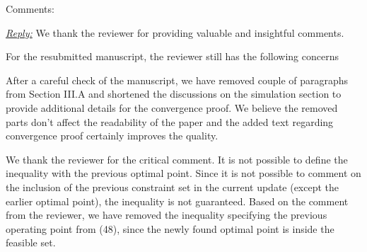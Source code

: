 Comments:

\vspace{1eM}
\underline{\textit{Reply:}} We thank the reviewer for providing valuable and insightful comments.

\vspace{1eM}
For the resubmitted manuscript, the reviewer still has the following concerns

\begin{enumerate}
 

\resp After a careful check of the manuscript, we have removed couple of paragraphs from Section III.A and shortened the discussions on the simulation section to provide additional details for the convergence proof. We believe the removed parts don't affect the readability of the paper and the added text regarding convergence proof certainly improves the quality. 

 

\resp We thank the reviewer for the critical comment. It is not possible to define the inequality with the previous optimal point. Since it is not possible to comment on the inclusion of the previous constraint set in the current update (except the earlier optimal point), the inequality is not guaranteed. Based on the comment from the reviewer, we have removed the inequality specifying the previous operating point from (48), since the newly found optimal point is inside the feasible set. 

 


\end{enumerate}
